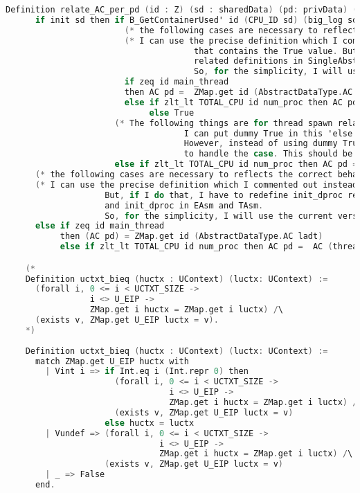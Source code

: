 \begin{lstlisting}[language=C]
    Definition relate_AC_per_pd (id : Z) (sd : sharedData) (pd: privData) (ladt : AbstractDataType.RData) :=
      if init sd then if B_GetContainerUsed' id (CPU_ID sd) (big_log sd) then 
                        (* the following cases are necessary to reflects the correct behaviour of the initialization *)
                        (* I can use the precise definition which I commented out instead of the version 
                                      that contains the True value. But, if I do that, I have to redefine init_dproc
                                      related definitions in SingleAbstractDataType and init_dproc in EAsm and TAsm.
                                      So, for the simplicity, I will use the current version *)
                        if zeq id main_thread 
                        then AC pd =  ZMap.get id (AbstractDataType.AC ladt)
                        else if zlt_lt TOTAL_CPU id num_proc then AC pd = ZMap.get id (AbstractDataType.AC ladt) 
                             else True
                      (* The following things are for thread spawn related_RData.
                                    I can put dummy True in this 'else' case, and prove the case for thread_spawn. 
                                    However, instead of using dummy True, I decided to add the precise value 
                                    to handle the case. This should be much better then the dummy True *)
                      else if zlt_lt TOTAL_CPU id num_proc then AC pd = AC (thread_init_dproc id) else True
      (* the following cases are necessary to reflects the correct behaviour of the initialization *)
      (* I can use the precise definition which I commented out instead of the version that contains the True value.
                    But, if I do that, I have to redefine init_dproc related definitions in SingleAbstractDataType 
                    and init_dproc in EAsm and TAsm.
                    So, for the simplicity, I will use the current version *)
      else if zeq id main_thread 
           then (AC pd) = ZMap.get id (AbstractDataType.AC ladt) 
           else if zlt_lt TOTAL_CPU id num_proc then AC pd =  AC (thread_init_dproc id) else True.

    (*
    Definition uctxt_bieq (huctx : UContext) (luctx: UContext) :=
      (forall i, 0 <= i < UCTXT_SIZE -> 
                 i <> U_EIP ->
                 ZMap.get i huctx = ZMap.get i luctx) /\ 
      (exists v, ZMap.get U_EIP luctx = v).
    *)
      
    Definition uctxt_bieq (huctx : UContext) (luctx: UContext) :=
      match ZMap.get U_EIP huctx with 
        | Vint i => if Int.eq i (Int.repr 0) then 
                      (forall i, 0 <= i < UCTXT_SIZE -> 
                                 i <> U_EIP ->
                                 ZMap.get i huctx = ZMap.get i luctx) /\ 
                      (exists v, ZMap.get U_EIP luctx = v)
                    else huctx = luctx
        | Vundef => (forall i, 0 <= i < UCTXT_SIZE -> 
                               i <> U_EIP ->
                               ZMap.get i huctx = ZMap.get i luctx) /\ 
                    (exists v, ZMap.get U_EIP luctx = v)
        | _ => False
      end.


\end{lstlisting}
